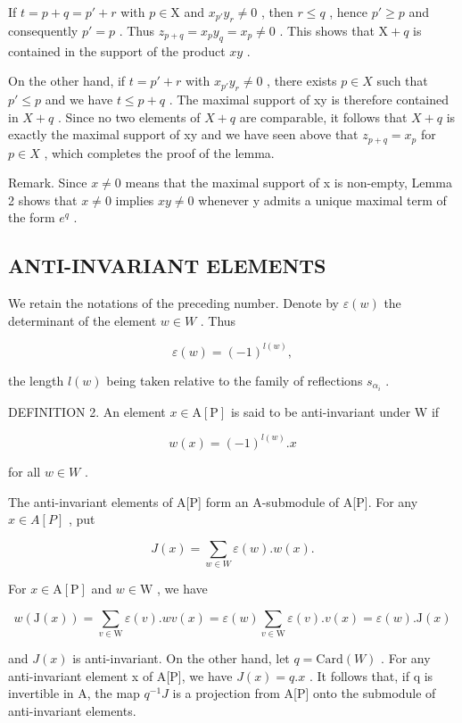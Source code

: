 If \(t = p + q = p' + r\) with \(p \in \mathrm{X}\) and \(x_{p'}y_r \neq 0\) , then \(r \leqslant q\) , hence \(p' \geqslant p\) and consequently \(p' = p\) . Thus \(z_{p + q} = x_p y_q = x_p \neq 0\) . This shows that \(\mathrm{X} + q\) is contained in the support of the product \(xy\) .

On the other hand, if \(t = p' + r\) with \(x_{p'} y_r \neq 0\) , there exists \(p \in X\) such that \(p' \leqslant p\) and we have \(t \leqslant p + q\) . The maximal support of xy is therefore contained in \(X + q\) . Since no two elements of \(X + q\) are comparable, it follows that \(X + q\) is exactly the maximal support of xy and we have seen above that \(z_{p+q} = x_p\) for \(p \in X\) , which completes the proof of the lemma.

Remark. Since \(x \neq 0\) means that the maximal support of x is non-empty, Lemma 2 shows that \(x \neq 0\) implies \(xy \neq 0\) whenever y admits a unique maximal term of the form \(e^{q}\) .

\subsection{ANTI-INVARIANT ELEMENTS}

We retain the notations of the preceding number. Denote by \(\varepsilon(w)\) the determinant of the element \(w \in W\) . Thus

\[
\varepsilon (w) = (- 1) ^ {l (w)},
\]

the length \(l(w)\) being taken relative to the family of reflections \(s_{\alpha_i}\) .

DEFINITION 2. An element \(x \in \mathrm{A}[\mathrm{P}]\) is said to be anti-invariant under W if

\[
w (x) = (- 1) ^ {l (w)}. x
\]

for all \(w \in W\) .

The anti-invariant elements of A{[}P{]} form an A-submodule of A{[}P{]}. For any \(x \in A[P]\) , put

\[
J (x) = \sum_ {w \in W} \varepsilon (w). w (x).\tag{1}
\]

For \(x \in \mathrm{A}[\mathrm{P}]\) and \(w \in \mathrm{W}\) , we have

\[
w (\mathrm{J} (x)) = \sum_ {v \in \mathrm{W}} \varepsilon (v). w v (x) = \varepsilon (w) \sum_ {v \in \mathrm{W}} \varepsilon (v). v (x) = \varepsilon (w). \mathrm{J} (x)
\]

and \(J(x)\) is anti-invariant. On the other hand, let \(q = \text{Card}(W)\) . For any anti-invariant element x of A{[}P{]}, we have \(J(x) = q.x\) . It follows that, if q is invertible in A, the map \(q^{-1}J\) is a projection from A{[}P{]} onto the submodule of anti-invariant elements.


